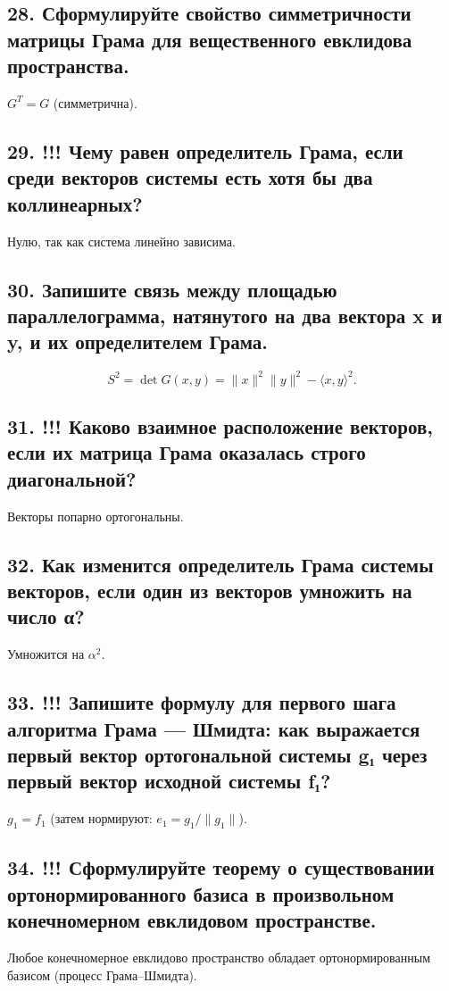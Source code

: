 \documentclass[a4paper,12pt]{article}
\begin{document}
\subsection*{28. Сформулируйте свойство симметричности матрицы Грама для вещественного евклидова пространства.}
\(G^T = G\) (симметрична).

\subsection*{29. !!! Чему равен определитель Грама, если среди векторов системы есть хотя бы два коллинеарных?}
Нулю, так как система линейно зависима.

\subsection*{30. Запишите связь между площадью параллелограмма, натянутого на два вектора x и y, и их определителем Грама.}
\[ S^2 = \det G(x,y) = \|x\|^2 \|y\|^2 - \langle x, y \rangle^2. \]

\subsection*{31. !!! Каково взаимное расположение векторов, если их матрица Грама оказалась строго диагональной?}
Векторы попарно ортогональны.

\subsection*{32. Как изменится определитель Грама системы векторов, если один из векторов умножить на число α?}
Умножится на \(\alpha^2\).

\subsection*{33. !!! Запишите формулу для первого шага алгоритма Грама — Шмидта: как выражается первый вектор ортогональной системы g₁ через первый вектор исходной системы f₁?}
\(g_1 = f_1\) (затем нормируют: \(e_1 = g_1 / \|g_1\|\)).

\subsection*{34. !!! Сформулируйте теорему о существовании ортонормированного базиса в произвольном конечномерном евклидовом пространстве.}
Любое конечномерное евклидово пространство обладает ортонормированным базисом (процесс Грама–Шмидта).
\end{document}
